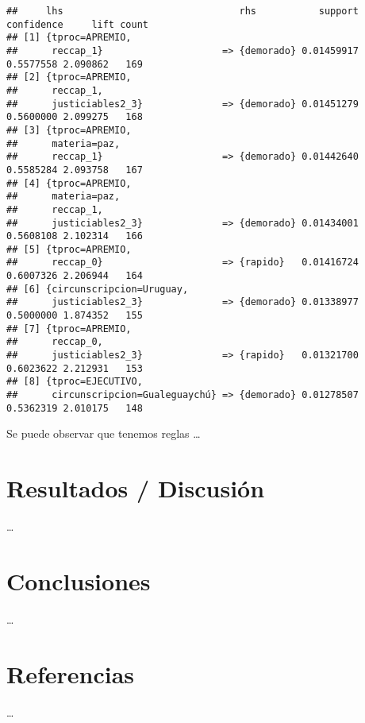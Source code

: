 \documentclass[runningheads,a4paper]{llncs}
\begin{document}
\begin{verbatim}
##     lhs                               rhs           support confidence     lift count
## [1] {tproc=APREMIO,                                                                  
##      reccap_1}                     => {demorado} 0.01459917  0.5577558 2.090862   169
## [2] {tproc=APREMIO,                                                                  
##      reccap_1,                                                                       
##      justiciables2_3}              => {demorado} 0.01451279  0.5600000 2.099275   168
## [3] {tproc=APREMIO,                                                                  
##      materia=paz,                                                                    
##      reccap_1}                     => {demorado} 0.01442640  0.5585284 2.093758   167
## [4] {tproc=APREMIO,                                                                  
##      materia=paz,                                                                    
##      reccap_1,                                                                       
##      justiciables2_3}              => {demorado} 0.01434001  0.5608108 2.102314   166
## [5] {tproc=APREMIO,                                                                  
##      reccap_0}                     => {rapido}   0.01416724  0.6007326 2.206944   164
## [6] {circunscripcion=Uruguay,                                                        
##      justiciables2_3}              => {demorado} 0.01338977  0.5000000 1.874352   155
## [7] {tproc=APREMIO,                                                                  
##      reccap_0,                                                                       
##      justiciables2_3}              => {rapido}   0.01321700  0.6023622 2.212931   153
## [8] {tproc=EJECUTIVO,                                                                
##      circunscripcion=Gualeguaychú} => {demorado} 0.01278507  0.5362319 2.010175   148
\end{verbatim}

Se puede observar que tenemos reglas \ldots{}

\section{Resultados / Discusión}\label{resultados-discusion}

\ldots{}

\section{Conclusiones}\label{conclusiones}

\ldots{}

\section{Referencias}\label{referencias}

\ldots{}
\end{document}
